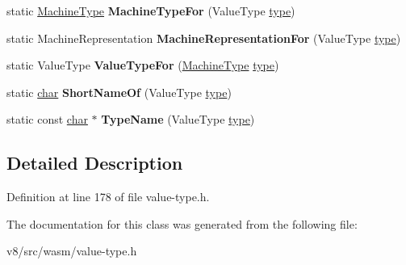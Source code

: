\begin{DoxyCompactItemize}
static \mbox{\hyperlink{classv8_1_1internal_1_1MachineType}{Machine\+Type}} {\bfseries Machine\+Type\+For} (Value\+Type \mbox{\hyperlink{classstd_1_1conditional_1_1type}{type}})
\item 
\mbox{\label{classv8_1_1internal_1_1wasm_1_1ValueTypes_a61e953b12b5c7ba00b13b7f7edaa2ac4}} 
static Machine\+Representation {\bfseries Machine\+Representation\+For} (Value\+Type \mbox{\hyperlink{classstd_1_1conditional_1_1type}{type}})
\item 
\mbox{\label{classv8_1_1internal_1_1wasm_1_1ValueTypes_a10a8aafdf9ad48ae1538a0dd1757827c}} 
static Value\+Type {\bfseries Value\+Type\+For} (\mbox{\hyperlink{classv8_1_1internal_1_1MachineType}{Machine\+Type}} \mbox{\hyperlink{classstd_1_1conditional_1_1type}{type}})
\item 
\mbox{\label{classv8_1_1internal_1_1wasm_1_1ValueTypes_ae9d102b0e77f7a0a31ce4a28840edc48}} 
static \mbox{\hyperlink{classchar}{char}} {\bfseries Short\+Name\+Of} (Value\+Type \mbox{\hyperlink{classstd_1_1conditional_1_1type}{type}})
\item 
\mbox{\label{classv8_1_1internal_1_1wasm_1_1ValueTypes_a08891020674a89ade3c56734b9c59d80}} 
static const \mbox{\hyperlink{classchar}{char}} $\ast$ {\bfseries Type\+Name} (Value\+Type \mbox{\hyperlink{classstd_1_1conditional_1_1type}{type}})
\end{DoxyCompactItemize}


\subsection{Detailed Description}


Definition at line 178 of file value-\/type.\+h.



The documentation for this class was generated from the following file\+:\begin{DoxyCompactItemize}
\item 
v8/src/wasm/value-\/type.\+h\end{DoxyCompactItemize}
